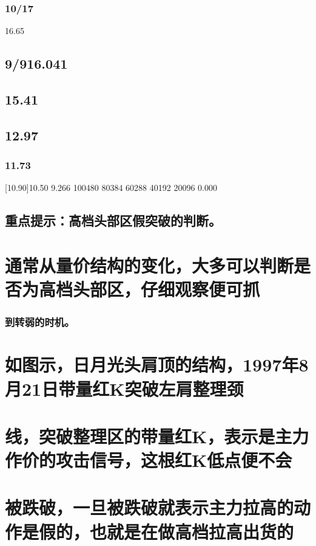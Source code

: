 \documentclass{article}
\begin{document}
\subsubsection{10/17}

16.65

\subsection{9/916.041}

\subsection{15.41}

\subsection{12.97}

\subsubsection{11.73}

[10.90]10.50 9.266 100480 80384 60288 40192 20096 0.000

\subsection{重点提示：高档头部区假突破的判断。}

\section{通常从量价结构的变化，大多可以判断是否为高档头部区，仔细观察便可抓}

\subsubsection{到转弱的时机。}

\section{如图示，日月光头肩顶的结构，1997年8月21日带量红K突破左肩整理颈}

\section{线，突破整理区的带量红K，表示是主力作价的攻击信号，这根红K低点便不会}

\section{被跌破，一旦被跌破就表示主力拉高的动作是假的，也就是在做高档拉高出货的}
\end{document}
